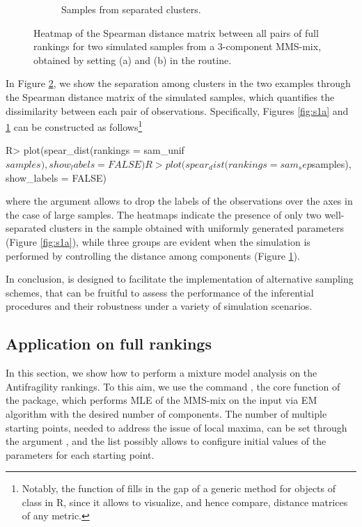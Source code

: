 \begin{figure}[t]
\begin{subfigure}[b]{0.49\textwidth}
         \caption{{Samples from separated clusters.}}
         \label{fig:s1b}
     \end{subfigure}
        \caption{{Heatmap of the Spearman distance matrix between all pairs of full rankings for two simulated samples from a 3-component MMS-mix, obtained by setting  (a) and  (b) in the  routine.}}
        \label{fig:s1}
\end{figure}
In Figure \ref{fig:s1}, we show the separation among clusters in the two examples through the Spearman distance matrix of the simulated samples, which quantifies the dissimilarity between each pair of observations. Specifically, Figures \ref{fig:s1a} and \ref{fig:s1b} can be constructed as follows\footnote{Notably, the  function of  fills in the gap of a generic method for objects of class  in \textsf{R}, since it allows to visualize, and hence compare, distance matrices of any metric.}
\begin{example}
R> plot(spear_dist(rankings = sam_unif$samples), show_labels = FALSE)
R> plot(spear_dist(rankings = sam_sep$samples), show_labels = FALSE)
\end{example}
{where the argument  allows to drop the labels of the observations over the axes in the case of large samples.}
{The heatmaps indicate} the presence of only two well-separated clusters in the sample {obtained with uniformly generated parameters (Figure \ref{fig:s1a})}, while three groups are evident {when the simulation is performed by controlling the distance among components (Figure \ref{fig:s1b}).}

In conclusion,  is designed to facilitate the implementation of alternative sampling schemes, that can be fruitful to assess the performance of the inferential procedures and their robustness under a variety of simulation scenarios.


\subsection{Application on full rankings}
\label{subsec:est_full}
In this section, we show how to perform a mixture model analysis on the Antifragility rankings.
To this aim, we use the command , the core function of the  package, which performs MLE of the MMS-mix on the input  via EM algorithm with the desired number  of components. The number of multiple starting points, needed to address the issue of local maxima, can be set through the argument , and the list  possibly allows to configure initial values of the parameters for each starting point.

